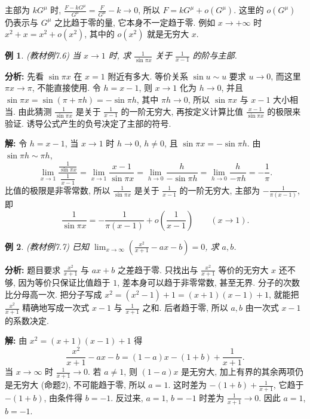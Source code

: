 \documentclass[UTF8,openany]{ctexbook}
\theoremstyle{chinesetextbook}
\newtheorem{example}{例}[section]
\newenvironment{cnsolution}{\par\indent\textbf{解:} \ignorespaces}{\par}
\begin{document}
主部为 $kG^\mu$ 时, $\displaystyle\frac{F-kG^\mu}{G^\mu}=\frac F{G^\mu}-k\to0$, 所以 $F=kG^\mu+o(G^\mu)$. 这里的 $o(G^\mu)$ 仍表示与 $G^\mu$ 之比趋于零的量, 它本身不一定趋于零. 例如 $x\to+\infty$ 时 $x^2+x=x^2+o(x^2)$, 其中的 $o(x^2)$ 就是无穷大 $x$.
\begin{example}\label{ex:7-6}
\textnormal{(教材例7.6)} 当 $x\to1$ 时, 求 $\displaystyle\frac1{\sin\pi x}$ 关于 $\displaystyle\frac1{x-1}$ 的阶与主部.
\end{example}
\par\indent\textbf{分析:} 先看 $\sin\pi x$ 在 $x=1$ 附近有多大. 等价关系 $\sin u\sim u$ 要求 $u\to0$, 而这里 $\pi x\to\pi$, 不能直接使用. 令 $h=x-1$, 则 $x\to1$ 化为 $h\to0$, 并且 $\sin\pi x=\sin(\pi+\pi h)=-\sin\pi h$, 其中 $\pi h\to0$, 所以 $\sin\pi x$ 与 $x-1$ 大小相当. 由此猜测 $\displaystyle\frac1{\sin\pi x}$ 是关于 $\displaystyle\frac1{x-1}$ 的一阶无穷大, 再按定义计算比值 $\displaystyle\frac{x-1}{\sin\pi x}$ 的极限来验证. 诱导公式产生的负号决定了主部的符号.
\begin{cnsolution}
令 $h=x-1$, 当 $x\to1$ 时 $h\to0$, $h\ne0$, 且 $\sin\pi x=-\sin\pi h$. 由 $\sin\pi h\sim\pi h$,
\[
\lim_{x\to1}\frac{\frac1{\sin\pi x}}{\frac1{x-1}}=\lim_{x\to1}\frac{x-1}{\sin\pi x}=\lim_{h\to0}\frac h{-\sin\pi h}=\lim_{h\to0}\frac h{-\pi h}=-\frac1\pi.
\]
比值的极限是非零常数, 所以 $\displaystyle\frac1{\sin\pi x}$ 是关于 $\displaystyle\frac1{x-1}$ 的一阶无穷大, 主部为 $\displaystyle-\frac1{\pi(x-1)}$, 即
\[
\frac1{\sin\pi x}=-\frac1{\pi(x-1)}+o\!\left(\frac1{x-1}\right)\qquad(x\to1).
\]
\end{cnsolution}
\begin{example}
\textnormal{(教材例7.7)} 已知 $\displaystyle\lim_{x\to\infty}\left(\frac{x^2}{x+1}-ax-b\right)=0$, 求 $a,b$.
\end{example}
\par\indent\textbf{分析:} 题目要求 $\displaystyle\frac{x^2}{x+1}$ 与 $ax+b$ 之差趋于零. 只找出与 $\displaystyle\frac{x^2}{x+1}$ 等价的无穷大 $x$ 还不够, 因为等价只保证比值趋于 $1$, 差本身可以趋于非零常数, 甚至无界. 分子的次数比分母高一次. 把分子写成 $x^2=(x^2-1)+1=(x+1)(x-1)+1$, 就能把 $\displaystyle\frac{x^2}{x+1}$ 精确地写成一次式 $x-1$ 与 $\displaystyle\frac1{x+1}$ 之和. 后者趋于零, 所以 $a,b$ 由一次式 $x-1$ 的系数决定.
\begin{cnsolution}
由 $x^2=(x+1)(x-1)+1$ 得
\[
\frac{x^2}{x+1}-ax-b=(1-a)x-(1+b)+\frac1{x+1}.
\]
当 $x\to\infty$ 时 $\displaystyle\frac1{x+1}\to0$. 若 $a\ne1$, 则 $(1-a)x$ 是无穷大, 加上有界的其余两项仍是无穷大 (命题2), 不可能趋于零, 所以 $a=1$. 这时差为 $\displaystyle-(1+b)+\frac1{x+1}$, 它趋于 $-(1+b)$, 由条件得 $b=-1$. 反过来, $a=1$, $b=-1$ 时差为 $\displaystyle\frac1{x+1}\to0$. 因此 $a=1$, $b=-1$.
\end{cnsolution}
\end{document}
